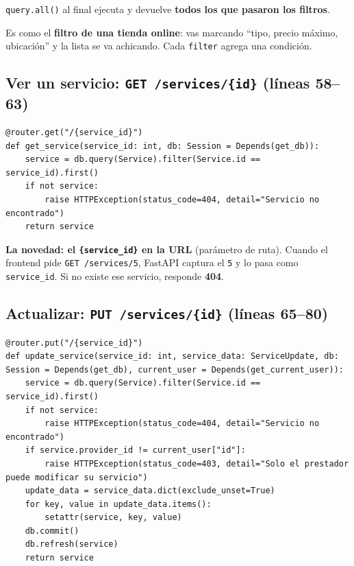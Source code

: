 \documentclass[11pt,a4paper]{article}
\begin{document}
\texttt{query.all()} al final ejecuta y devuelve \textbf{todos los que pasaron los filtros}.

\begin{analogia}
Es como el \textbf{filtro de una tienda online}: vas marcando ``tipo, precio máximo,
ubicación'' y la lista se va achicando. Cada \texttt{filter} agrega una condición.
\end{analogia}

\subsection{Ver un servicio: \texttt{GET /services/\{id\}} (líneas 58--63)}

\begin{lstlisting}
@router.get("/{service_id}")
def get_service(service_id: int, db: Session = Depends(get_db)):
    service = db.query(Service).filter(Service.id == service_id).first()
    if not service:
        raise HTTPException(status_code=404, detail="Servicio no encontrado")
    return service
\end{lstlisting}

\textbf{La novedad: el \texttt{\{service\_id\}} en la URL} (parámetro de ruta). Cuando el frontend
pide \texttt{GET /services/5}, FastAPI captura el \texttt{5} y lo pasa como \texttt{service\_id}.
Si no existe ese servicio, responde \textbf{404}.

\subsection{Actualizar: \texttt{PUT /services/\{id\}} (líneas 65--80)}

\begin{lstlisting}
@router.put("/{service_id}")
def update_service(service_id: int, service_data: ServiceUpdate, db: Session = Depends(get_db), current_user = Depends(get_current_user)):
    service = db.query(Service).filter(Service.id == service_id).first()
    if not service:
        raise HTTPException(status_code=404, detail="Servicio no encontrado")
    if service.provider_id != current_user["id"]:
        raise HTTPException(status_code=403, detail="Solo el prestador puede modificar su servicio")
    update_data = service_data.dict(exclude_unset=True)
    for key, value in update_data.items():
        setattr(service, key, value)
    db.commit()
    db.refresh(service)
    return service
\end{lstlisting}
\end{document}
